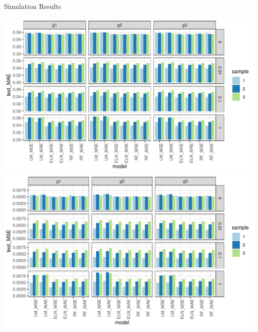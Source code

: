 \documentclass[a4paper, table]{article}
\begin{document}
\begin{table}
	\caption{Simulation Results}
	\begin{center}
		\includegraphics{simulation_test_mae.pdf}
		\includegraphics{simulation_test_mse.pdf}
	\end{center}
\end{table}
\end{document}
